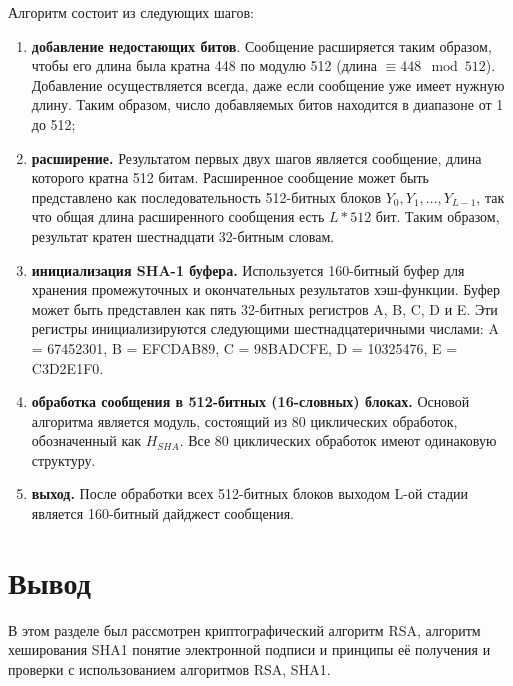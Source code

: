 Алгоритм состоит из следующих шагов:

\begin{enumerate}
	\item \textbf{добавление недостающих битов}. Сообщение расширяется таким образом, чтобы его длина была кратна 448 по модулю 512 (длина $\equiv  448 \mod 512$). Добавление осуществляется всегда, даже если сообщение уже имеет нужную длину. Таким образом, число добавляемых битов находится в диапазоне от 1 до 512;
	\item \textbf{расширение.} Результатом первых двух шагов является сообщение, длина которого кратна 512 битам. Расширенное сообщение может быть представлено как последовательность 512-битных блоков $Y_0, Y_1, . . . , Y_{L-1}$, так что общая длина расширенного сообщения есть $L * 512$ бит. Таким образом, результат кратен шестнадцати 32-битным словам.
	\item \textbf{инициализация SHA-1 буфера.} Используется 160-битный буфер для хранения промежуточных и окончательных результатов хэш-функции. Буфер может быть представлен как пять 32-битных регистров A, B, C, D и E. Эти регистры инициализируются следующими шестнадцатеричными числами: A = 67452301, B = EFCDAB89, C = 98BADCFE, D = 10325476, E = C3D2E1F0.
	\item \textbf{обработка сообщения в 512-битных (16-словных) блоках.} Основой алгоритма является модуль, состоящий из 80 циклических обработок, обозначенный как $H_{SHA}$. Все 80 циклических обработок имеют одинаковую структуру.
	\item \textbf{выход.} После обработки всех 512-битных блоков выходом L-ой стадии является 160-битный дайджест сообщения.
\end{enumerate}


\section*{Вывод} 

В этом разделе был рассмотрен криптографический алгоритм RSA, алгоритм хеширования SHA1 понятие электронной подписи и принципы её получения и проверки с использованием алгоритмов RSA, SHA1.